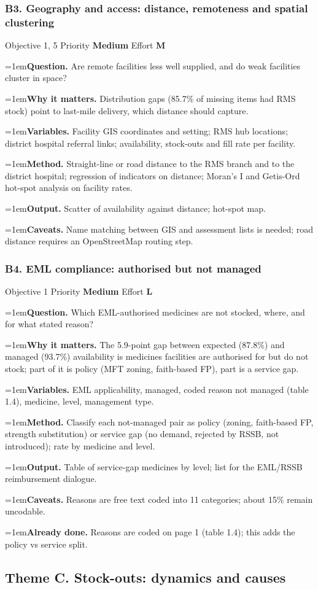 \documentclass[10pt,a4paper]{article}
\newcommand{\field}[2]{\par\hangindent=1em\textbf{#1.} #2}
\begin{document}
\subsubsection*{B3. Geography and access: distance, remoteness and spatial clustering}
{\footnotesize\color{gray} Objective 1, 5 \textperiodcentered{} Priority \textbf{Medium} \textperiodcentered{} Effort \textbf{M}}
\field{Question}{Are remote facilities less well supplied, and do weak facilities cluster in space?}
\field{Why it matters}{Distribution gaps (85.7\% of missing items had RMS stock) point to last-mile delivery, which distance should capture.}
\field{Variables}{Facility GIS coordinates and setting; RMS hub locations; district hospital referral links; availability, stock-outs and fill rate per facility.}
\field{Method}{Straight-line or road distance to the RMS branch and to the district hospital; regression of indicators on distance; Moran's I and Getis-Ord hot-spot analysis on facility rates.}
\field{Output}{Scatter of availability against distance; hot-spot map.}
\field{Caveats}{Name matching between GIS and assessment lists is needed; road distance requires an OpenStreetMap routing step.}
\subsubsection*{B4. EML compliance: authorised but not managed}
{\footnotesize\color{gray} Objective 1 \textperiodcentered{} Priority \textbf{Medium} \textperiodcentered{} Effort \textbf{L}}
\field{Question}{Which EML-authorised medicines are not stocked, where, and for what stated reason?}
\field{Why it matters}{The 5.9-point gap between expected (87.8\%) and managed (93.7\%) availability is medicines facilities are authorised for but do not stock; part of it is policy (MFT zoning, faith-based FP), part is a service gap.}
\field{Variables}{EML applicability, managed, coded reason not managed (table 1.4), medicine, level, management type.}
\field{Method}{Classify each not-managed pair as policy (zoning, faith-based FP, strength substitution) or service gap (no demand, rejected by RSSB, not introduced); rate by medicine and level.}
\field{Output}{Table of service-gap medicines by level; list for the EML/RSSB reimbursement dialogue.}
\field{Caveats}{Reasons are free text coded into 11 categories; about 15\% remain uncodable.}
\field{Already done}{Reasons are coded on page 1 (table 1.4); this adds the policy vs service split.}
\subsection{Theme C. Stock-outs: dynamics and causes}
\end{document}
